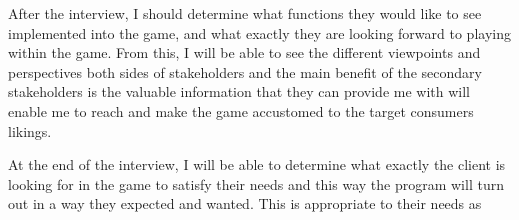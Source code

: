 \documentclass[11pt,a4paper]{report}
\begin{document}
\noindent After the interview, I should determine what functions they would like to see implemented into the game, and what exactly they are looking forward to playing within the game. From this, I will be able to see the different viewpoints and perspectives both sides of stakeholders and the main benefit of the secondary stakeholders is the valuable information that they can provide me with will enable me to reach and make the game accustomed to the target consumers likings.  \newline

\noindent At the end of the interview, I will be able to determine what exactly the client is looking for in the game to satisfy their needs and this way the program will turn out in a way they expected and wanted. This is appropriate to their needs as \newline
\end{document}
